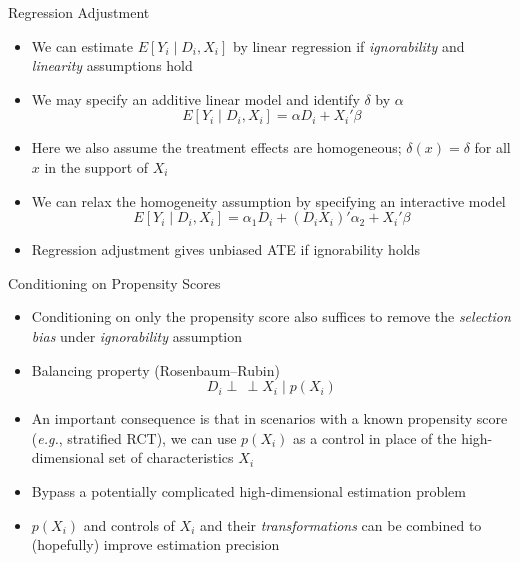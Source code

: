 \documentclass[aspectratio=1610,12pt,xcolor=dvipsnames]{beamer}
\newcommand{\indep}{\perp\!\!\!\, \perp}
\begin{document}
\begin{frame}{Regression Adjustment}
\begin{itemize}
\item We can estimate $E[Y_i \mid D_i, X_i]$ by linear regression if \textit{ignorability} and \textit{linearity} assumptions hold
\item We may specify an additive linear model and identify $\delta$ by $\alpha$  
\[
E[Y_i \mid D_i, X_i] = \alpha D_i + X_i'\beta
\]
\item Here we also assume the treatment effects are homogeneous; $\delta(x)=\delta$ for all $x$ in the support of $X_i$
\item We can relax the homogeneity assumption by specifying an interactive model  
\[
E[Y_i \mid D_i, X_i] = \alpha_1 D_i + (D_i X_i)'\alpha_2 + X_i'\beta
\]
\item Regression adjustment gives unbiased ATE if ignorability holds
\end{itemize}
\end{frame}

\begin{frame}{Conditioning on Propensity Scores}
\begin{itemize}
\item Conditioning on only the propensity score also suffices to remove the \textit{selection bias} under \textit{ignorability} assumption  
\item Balancing property (Rosenbaum–Rubin) 
\[
D_i \indep X_i \mid p(X_i)
\]
\item An important consequence is that in scenarios with a known propensity score (\textit{e.g.}, stratified RCT), we can use $p(X_i)$ as a control in place of the high-dimensional set of characteristics $X_i$
\item Bypass a potentially complicated high-dimensional estimation problem
\item $p(X_i)$ and controls of $X_i$ and their \textit{transformations} can be combined to (hopefully) improve estimation precision
\end{itemize}
\end{frame}
\end{document}
